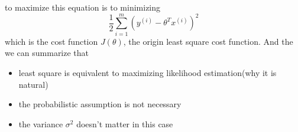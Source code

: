 \documentclass[10pt,a4paper,oneside]{article}
\begin{document}
to maximize this equation is to minimizing
\[
\frac{1}{2} \sum_{i=1}^{m} ( y^{(i)} - \theta^T x^{(i)})^2
\]
which is the cost function $J(\theta)$, the origin least square cost function. And the we can summarize that
\begin{itemize}
	\item least square is equivalent to maximizing likelihood estimation(why it is natural)
	\item the probabilistic assumption is not necessary
	\item the variance $\sigma^2$ doesn't matter in this case  
\end{itemize}
\end{document}
